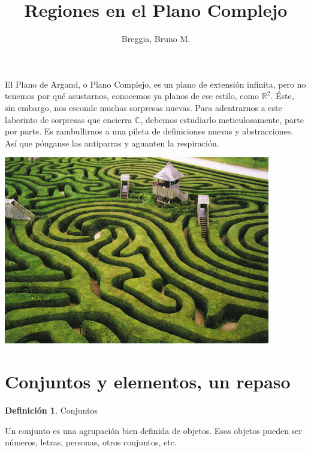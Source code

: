\documentclass[12pt]{article}
\theoremstyle{definition}
\newtheorem{definition}{Definici\'on}[section]
\begin{document}
	\title{Regiones en el Plano Complejo}
	\author{Breggia, Bruno M.}
	\date{}
	\maketitle
	
El Plano de Argand, o Plano Complejo, es un plano de extensi\'on infinita, pero no tenemos por qu\'e asustarnos, conocemos ya planos de ese estilo, como $\mathbb{R}^2$. \'Este, sin embargo, nos esconde muchas sorpresas nuevas. Para adentrarnos a este laberinto de sorpresas que encierra $\mathbb{C}$, debemos estudiarlo meticulosamente, parte por parte. Es zambullirnos a una pileta de definiciones nuevas y abstracciones. As\'i que p\'onganse las antiparras y aguanten la respiraci\'on.
\linebreak
	
\begin{center}
	\includegraphics[scale=0.8]{laberinto.jpg}
\end{center}

\pagebreak
\tableofcontents
\pagebreak

\section{Conjuntos y elementos, un repaso}

\colorbox{red!40!white!80}{\parbox{\linewidth}{
\theoremstyle{definition}
\begin{definition} Conjuntos

Un conjunto es una agrupaci\'on bien definida de objetos. Esos objetos pueden ser n\'umeros, letras, personas, otros conjuntos, etc.

\end{definition}}}
\linebreak
\end{document}
